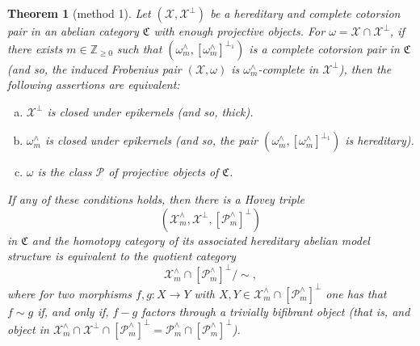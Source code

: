 \documentclass[10pt,reqno]{amsart}
\numberwithin{equation}{section}
\newtheorem{theorem}[definition]{Theorem}
\theoremstyle{remark}
\newcommand{\C}{\mathfrak{C}}
\newcommand{\X}{\mathcal{X}}
\begin{document}
\begin{theorem}[method 1] \label{HoveyinC}
Let $(\mathcal{X},\mathcal{X}^{\perp})$ be a hereditary and complete cotorsion pair in an abelian category $\mathfrak{C}$ with enough projective objects. For $\omega = \mathcal{X} \cap \mathcal{X}^\perp$, if there exists $m \in \mathbb{Z}_{\geq 0}$ such that $(\omega^\wedge_m, [\omega^\wedge_m]^{\perp_1})$ is a complete cotorsion pair in $\C$ (and so, the induced Frobenius pair $(\X,\omega)$ is $\omega^\wedge_m$-complete in $\X^\perp$), then the following assertions are equivalent:
\begin{enumerate}[(a)]
\item $\X^\perp$ is closed under epikernels (and so, thick).

\item $\omega^\wedge_m$ is closed under epikernels (and so, the pair $(\omega^\wedge_m, [\omega^\wedge_m]^{\perp_1})$ is hereditary).

\item $\omega$ is the class $\mathcal{P}$ of projective objects of $\C$.
\end{enumerate}
If any of these conditions holds, then there is a Hovey triple $$(\X^\wedge_m, \X^\perp, [\mathcal{P}^\wedge_m]^\perp)$$ in $\C$ and the homotopy category of its associated hereditary abelian model structure is equivalent to the quotient category $$\X^\wedge_m \cap [\mathcal{P}^\wedge_m]^\perp / \sim,$$ where for two morphisms $f, g \colon X \to Y$ with $X, Y \in \X^\wedge_m \cap [\mathcal{P}^\wedge_m]^\perp$ one has that $f \sim g$ if, and only if, $f - g$ factors through a trivially bifibrant object (that is, and object in $\X^\wedge_m \cap \mathcal{X}^\perp \cap [\mathcal{P}^\wedge_m]^\perp = \mathcal{P}^\wedge_m \cap [\mathcal{P}^\wedge_m]^\perp$). \newpage 
\end{theorem}
\end{document}
